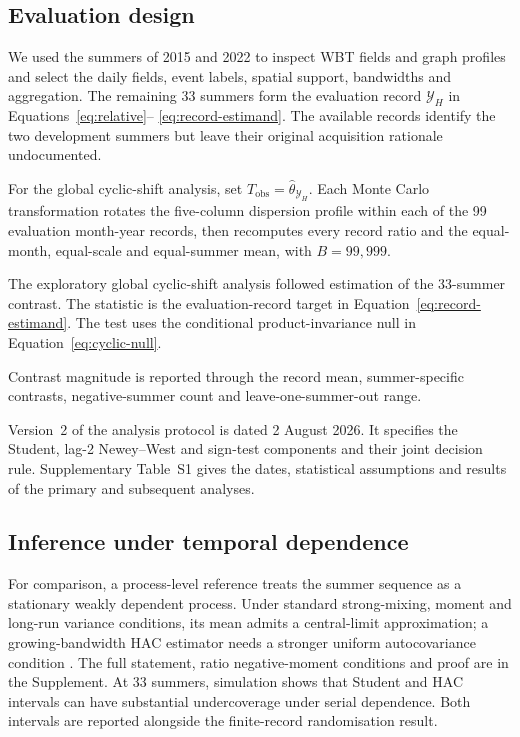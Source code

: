 \documentclass[namedate,webpdf,modern,mediumone]{oup-authoring-template}
\begin{document}
\subsection{Evaluation design}

We used the summers of 2015 and 2022 to inspect WBT fields and graph
profiles and select the daily fields, event labels, spatial support,
bandwidths and aggregation. The remaining 33 summers form the evaluation
record $\mathcal Y_H$ in Equations~\eqref{eq:relative}--
\eqref{eq:record-estimand}. The available records identify the two development
summers but leave their original acquisition rationale undocumented.

For the global cyclic-shift analysis, set
$T_{\mathrm{obs}}=\widehat\theta_{\mathcal Y_H}$. Each Monte Carlo
transformation rotates the five-column dispersion profile within each of the
99 evaluation month-year records, then recomputes every record ratio and the
equal-month, equal-scale and equal-summer mean, with $B=99{,}999$.

The exploratory global cyclic-shift analysis followed estimation of the
33-summer contrast. The
statistic is the evaluation-record target in
Equation~\eqref{eq:record-estimand}. The test uses the
conditional product-invariance null in Equation~\eqref{eq:cyclic-null}.

Contrast magnitude is reported through the record mean, summer-specific contrasts,
negative-summer count and leave-one-summer-out range.

Version~2 of the analysis protocol is dated 2 August 2026. It specifies the
Student, lag-2 Newey--West and sign-test components and their joint decision
rule. Supplementary Table~S1 gives the dates, statistical assumptions and
results of the primary and subsequent analyses.

\subsection{Inference under temporal dependence}

For comparison, a process-level reference treats the summer sequence as a
stationary weakly dependent process. Under standard strong-mixing, moment and
long-run variance conditions, its mean admits a central-limit approximation; a
growing-bandwidth HAC estimator needs a stronger uniform autocovariance condition
\citep{ibragimov1971,newey1987,andrews1991}. The full statement, ratio
negative-moment conditions and proof are in the Supplement. At 33 summers,
simulation shows that Student and HAC intervals can have substantial
undercoverage under serial dependence. Both intervals are reported alongside
the finite-record randomisation result.
\end{document}
